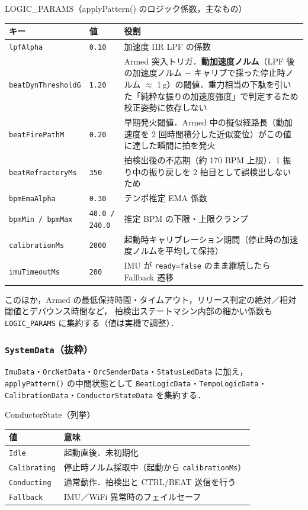 \documentclass[lualatex,book,paper=a4paper,jafontsize=11.5pt,jafontscale=1.05]{jlreq}
\begin{document}
\begin{apibox}{LOGIC\_PARAMS（applyPattern() のロジック係数，主なもの）}
\begin{tabular}{l l p{}}
\toprule
\textbf{キー} & \textbf{値} & \textbf{役割} \\
\midrule
\texttt{lpfAlpha}          & \texttt{0.10}  & 加速度 IIR LPF の係数 \\
\texttt{beatDynThresholdG} & \texttt{1.20}  & Armed 突入トリガ．\textbf{動加速度ノルム}（LPF 後の加速度ノルム $-$ キャリブで採った停止時ノルム $\approx$ 1\,g）の閾値．重力相当の下駄を引いた「純粋な振りの加速度強度」で判定するため校正姿勢に依存しない \\
\texttt{beatFirePathM}     & \texttt{0.20}  & 早期発火閾値．Armed 中の擬似経路長（動加速度を 2 回時間積分した近似変位）がこの値に達した瞬間に拍を発火 \\
\texttt{beatRefractoryMs}  & \texttt{350}   & 拍検出後の不応期（約 170 BPM 上限）．1 振り中の振り戻しを 2 拍目として誤検出しないため \\
\texttt{bpmEmaAlpha}       & \texttt{0.30}  & テンポ推定 EMA 係数 \\
\texttt{bpmMin / bpmMax}   & \texttt{40.0 / 240.0} & 推定 BPM の下限・上限クランプ \\
\texttt{calibrationMs}     & \texttt{2000}  & 起動時キャリブレーション期間（停止時の加速度ノルムを平均して保持） \\
\texttt{imuTimeoutMs}      & \texttt{200}   & IMU が \texttt{ready=false} のまま継続したら Fallback 遷移 \\
\bottomrule
\end{tabular}

\medskip
このほか，Armed の最低保持時間・タイムアウト，リリース判定の絶対／相対閾値とデバウンス時間など，
拍検出ステートマシン内部の細かい係数も \texttt{LOGIC\_PARAMS} に集約する（値は実機で調整）．
\end{apibox}

\subsubsection{\texttt{SystemData}（抜粋）}

\texttt{ImuData}・\texttt{OrcNetData}・\texttt{OrcSenderData}・\texttt{StatusLedData} に加え，
\texttt{applyPattern()} の中間状態として \texttt{BeatLogicData}・\texttt{TempoLogicData}・
\texttt{CalibrationData}・\texttt{ConductorStateData} を集約する．

\begin{apibox}{ConductorState（列挙）}
\begin{tabular}{l p{}}
\toprule
\textbf{値} & \textbf{意味} \\
\midrule
\texttt{Idle}        & 起動直後．未初期化 \\
\texttt{Calibrating} & 停止時ノルム採取中（起動から \texttt{calibrationMs}） \\
\texttt{Conducting}  & 通常動作．拍検出と CTRL/BEAT 送信を行う \\
\texttt{Fallback}    & IMU／WiFi 異常時のフェイルセーフ \\
\bottomrule
\end{tabular}
\end{apibox}
\end{document}
